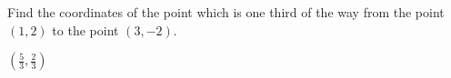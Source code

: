 
\begin{Exercise}[
name={},
title={}, 
difficulty=0,
origin={\cite{SM}}]

Find the coordinates of the point which is one third of the way from the point $(1,2)$ to the point $(3,-2)$.

\end{Exercise}

\begin{Answer}
$\left(\frac{5}{3},\frac{2}{3}\right)$

\end{Answer}
